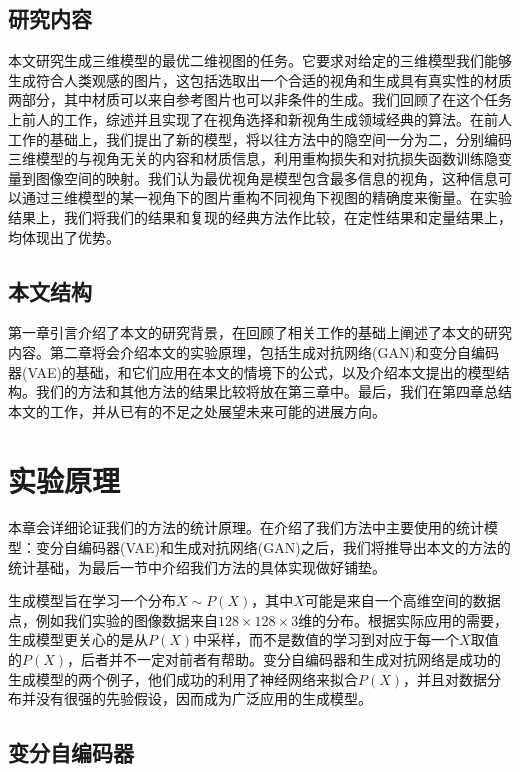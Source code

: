 \documentclass[UTF8,openany,AutoFakeBold,AutoFakeSlant,cs4size]{ctexbook}
\begin{document}
\section{研究内容}

本文研究生成三维模型的最优二维视图的任务。它要求对给定的三维模型我们能够生成符合人类观感的图片，这包括选取出一个合适的视角和生成具有真实性的材质两部分，其中材质可以来自参考图片也可以非条件的生成。我们回顾了在这个任务上前人的工作，综述并且实现了在视角选择和新视角生成领域经典的算法。在前人工作的基础上，我们提出了新的模型，将以往方法中的隐空间一分为二，分别编码三维模型的与视角无关的内容和材质信息，利用重构损失和对抗损失函数训练隐变量到图像空间的映射。我们认为最优视角是模型包含最多信息的视角，这种信息可以通过三维模型的某一视角下的图片重构不同视角下视图的精确度来衡量。在实验结果上，我们将我们的结果和复现的经典方法作比较，在定性结果和定量结果上，均体现出了优势。

\section{本文结构}

第一章引言介绍了本文的研究背景，在回顾了相关工作的基础上阐述了本文的研究内容。第二章将会介绍本文的实验原理，包括生成对抗网络(GAN)和变分自编码器(VAE)的基础，和它们应用在本文的情境下的公式，以及介绍本文提出的模型结构。我们的方法和其他方法的结果比较将放在第三章中。最后，我们在第四章总结本文的工作，并从已有的不足之处展望未来可能的进展方向。



\clearpage

\chapter{实验原理}

本章会详细论证我们的方法的统计原理。在介绍了我们方法中主要使用的统计模型：变分自编码器(VAE)\cite{kingma2014autoencoding}和生成对抗网络(GAN)\cite{NIPS2014_5423}之后，我们将推导出本文的方法的统计基础，为最后一节中介绍我们方法的具体实现做好铺垫。

生成模型旨在学习一个分布$X \sim P(X)$，其中$X$可能是来自一个高维空间的数据点，例如我们实验的图像数据来自$128 \times 128 \times 3$维的分布。根据实际应用的需要，生成模型更关心的是从$P(X)$中采样，而不是数值的学习到对应于每一个$X$取值的$P(X)$，后者并不一定对前者有帮助。变分自编码器和生成对抗网络是成功的生成模型的两个例子，他们成功的利用了神经网络来拟合$P(X)$，并且对数据分布并没有很强的先验假设，因而成为广泛应用的生成模型。

\section{变分自编码器}
\end{document}
